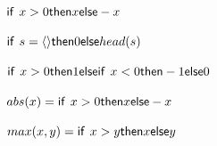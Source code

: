 \documentclass[a4paper,10pt,fleqn]{article}
\begin{document}
\noindent
$\IF x > 0 \THEN x \ELSE -x$


\noindent
$\IF s = \langle \rangle \THEN 0 \ELSE head(s)$


\noindent
$\IF x > 0 \THEN 1 \ELSE \IF x < 0 \THEN -1 \ELSE 0$


\noindent
$abs(x) = \IF x > 0 \THEN x \ELSE -x$


\noindent
$max(x, y) = \IF x > y \THEN x \ELSE y$
\end{document}

